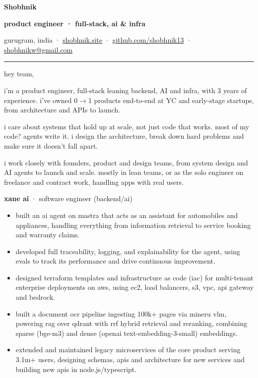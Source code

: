 \documentclass[10pt,a4paper]{article}
\newcommand{\heading}[1]{\vspace{4pt}{\color{accent}\footnotesize\bfseries\MakeUppercase{#1}}\par\vspace{-2pt}}
\newcommand{\lnk}[2]{\href{#1}{#2}}
\newcommand{\hr}{{\color{rulegray}\rule{\linewidth}{0.6pt}}}
\begin{document}
{\LARGE\bfseries Shobhnik}\par
\vspace{2pt}
{\color{accent}\bfseries product engineer · full-stack, ai \& infra}\par
{\color{muted}gurugram, india · \lnk{https://shobhnik.site}{shobhnik.site} · \lnk{https://github.com/shobhnik13}{github.com/shobhnik13} · \lnk{mailto:shobhnikw@gmail.com}{shobhnikw@gmail.com}}\par
\vspace{-2pt}
\hr

hey team,

i'm a product engineer, full-stack leaning backend, AI and infra, with 3 years of experience. i've owned 0$\rightarrow$1 products end-to-end at YC and early-stage startups, from architecture and APIs to launch.

i care about systems that hold up at scale, not just code that works. most of my code? agents write it. i design the architecture, break down hard problems and make sure it doesn't fall apart.

i work closely with founders, product and design teams, from system design and AI agents to launch and scale. mostly in lean teams, or as the solo engineer on freelance and contract work, handling apps with real users.

\heading{what i've done}

\textbf{xane ai} {\color{muted}· software engineer (backend/ai)}
\begin{itemize}
\item built an ai agent on mastra that acts as an assistant for automobiles and appliances, handling everything from information retrieval to service booking and warranty claims.
\item developed full traceability, logging, and explainability for the agent, using evals to track its performance and drive continuous improvement.
\item designed terraform templates and infrastructure as code (iac) for multi-tenant enterprise deployments on aws, using ec2, load balancers, s3, vpc, api gateway and bedrock.
\item built a document ocr pipeline ingesting 100k+ pages via mineru vlm, powering rag over qdrant with rrf hybrid retrieval and reranking, combining sparse (bge-m3) and dense (openai text-embedding-3-small) embeddings.
\item extended and maintained legacy microservices of the core product serving 3.1m+ users, designing schemas, apis and architecture for new services and building new apis in node.js/typescript.
\end{itemize}
\end{document}
